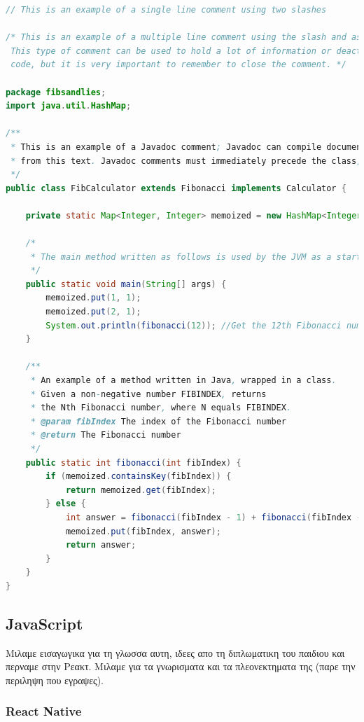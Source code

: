 \begin{lstlisting}[language=Java, caption=\selectlanguage{greek}Παράδειγμα κώδικα σε \selectlanguage{english}Java]
// This is an example of a single line comment using two slashes

/* This is an example of a multiple line comment using the slash and asterisk.
 This type of comment can be used to hold a lot of information or deactivate
 code, but it is very important to remember to close the comment. */

package fibsandlies;
import java.util.HashMap;

/**
 * This is an example of a Javadoc comment; Javadoc can compile documentation
 * from this text. Javadoc comments must immediately precede the class, method, or field being documented.
 */
public class FibCalculator extends Fibonacci implements Calculator {

    private static Map<Integer, Integer> memoized = new HashMap<Integer, Integer>();

    /*
     * The main method written as follows is used by the JVM as a starting point for the program.
     */
    public static void main(String[] args) {
        memoized.put(1, 1);
        memoized.put(2, 1);
        System.out.println(fibonacci(12)); //Get the 12th Fibonacci number and print to console
    }

    /**
     * An example of a method written in Java, wrapped in a class.
     * Given a non-negative number FIBINDEX, returns
     * the Nth Fibonacci number, where N equals FIBINDEX.
     * @param fibIndex The index of the Fibonacci number
     * @return The Fibonacci number
     */
    public static int fibonacci(int fibIndex) {
        if (memoized.containsKey(fibIndex)) {
            return memoized.get(fibIndex);
        } else {
            int answer = fibonacci(fibIndex - 1) + fibonacci(fibIndex - 2);
            memoized.put(fibIndex, answer);
            return answer;
        }
    }
}


\end{lstlisting}



\subsection{JavaScript}
Μιλαμε εισαγωγικα για τη γλωσσα αυτη, ιδεες απο τη διπλωματικη του παιδιου και περναμε στην Ρεακτ. Μιλαμε για τα γνωρισματα και τα πλεονεκτηματα της (παρε την περιληψη που εγραψες).

\subsubsection{React Native}

